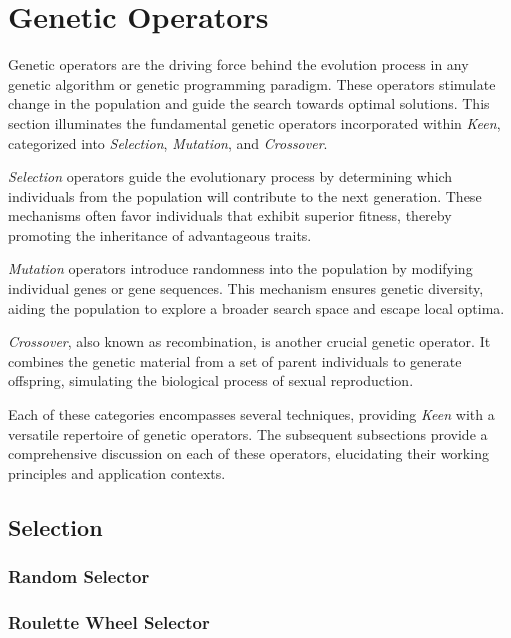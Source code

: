 
\section{Genetic Operators}
\label{sec:keen:operators}
  Genetic operators are the driving force behind the evolution process in any
  genetic algorithm or genetic programming paradigm.
  These operators stimulate change in the population and guide the search
  towards optimal solutions.
  This section illuminates the fundamental genetic operators incorporated within
  \textit{Keen}, categorized into \textit{Selection}, \textit{Mutation}, and
  \textit{Crossover}.

  \textit{Selection} operators guide the evolutionary process by determining
  which individuals from the population will contribute to the next generation.
  These mechanisms often favor individuals that exhibit superior fitness, 
  thereby promoting the inheritance of advantageous traits.

  \textit{Mutation} operators introduce randomness into the population by 
  modifying individual genes or gene sequences.
  This mechanism ensures genetic diversity, aiding the population to explore a 
  broader search space and escape local optima.

  \textit{Crossover}, also known as recombination, is another crucial genetic 
  operator.
  It combines the genetic material from a set of parent individuals to generate
  offspring, simulating the biological process of sexual reproduction.

  Each of these categories encompasses several techniques, providing
  \textit{Keen} with a versatile repertoire of genetic operators.
  The subsequent subsections provide a comprehensive discussion on each of these
  operators, elucidating their working principles and application contexts.

  \subsection{Selection}
  \label{sec:keen:operators:selection}
    \subsubsection{Random Selector}
    \label{sec:keen:operators:selection:random}
      \Blindtext
    \subsubsection{Roulette Wheel Selector}
    \label{sec:keen:operators:selection:roulette_wheel}
      \Blindtext
